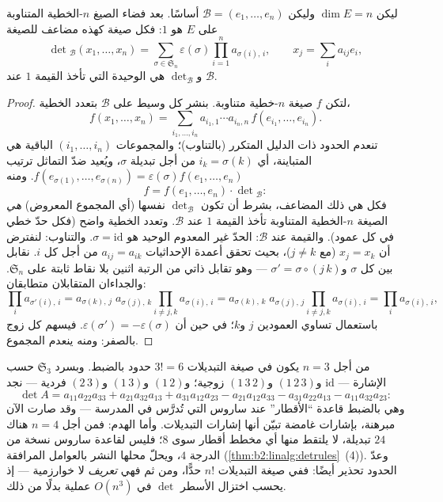 \begin{theorem}\label{thm:b2:linalg:detspace}
ليكن $\dim E = n$ وليكن $\mathcal{B} = (e_1, \dots, e_n)$ أساسًا. بعد
فضاء الصيغ $n$-الخطية المتناوبة على $E$ هو $1$:
فكل صيغة كهذه مضاعف للصيغة
\[
\det{}_{\mathcal{B}}(x_1, \dots, x_n)
= \sum_{\sigma \in \mathfrak{S}_n} \varepsilon(\sigma)
\prod_{i=1}^{n} a_{\sigma(i),\,i},
\qquad
x_j = \sum_{i} a_{ij} e_i ,
\]
و$\det_{\mathcal{B}}$ هي الوحيدة التي تأخذ القيمة $1$ عند
$\mathcal{B}$.
\end{theorem}

\begin{proof}
لتكن $f$ صيغة $n$-خطية متناوبة. بنشر كل وسيط على
$\mathcal{B}$ بتعدد الخطية،
\[
f(x_1, \dots, x_n)
= \sum_{i_1, \dots, i_n} a_{i_1,1}\cdots a_{i_n,n}\,
f(e_{i_1}, \dots, e_{i_n}).
\]
تنعدم الحدود ذات الدليل المتكرر (بالتناوب)؛ والمجموعات
$(i_1, \dots, i_n)$ الباقية هي المتباينة، أي $i_k =
\sigma(k)$ من أجل تبديلة $\sigma$، ويُعيد ضدّ التماثل ترتيب
$f(e_{\sigma(1)}, \dots, e_{\sigma(n)}) = \varepsilon(\sigma)
f(e_1, \dots, e_n)$. ومنه
\[
f = f(e_1, \dots, e_n) \cdot \det{}_{\mathcal{B}} :
\]
فكل  هي ذلك المضاعف، بشرط أن تكون
$\det_{\mathcal{B}}$ نفسها (أي المجموع المعروض) \emph{هي} الصيغة
$n$-الخطية المتناوبة تأخذ القيمة $1$ عند $\mathcal B$.
وتعدد الخطية واضح (فكل حدّ خطي في كل عمود).
والقيمة عند $\mathcal B$: الحدّ غير المعدوم الوحيد هو $\sigma =
\mathrm{id}$. والتناوب: لنفترض أن $x_j = x_k$ (مع $j \neq k$)، بحيث
تحقق أعمدة الإحداثيات $a_{i j} = a_{i k}$ من أجل كل
$i$. نقابل بين كل $\sigma$ و$\sigma' = \sigma\circ(j\,k)$ ---
وهو تقابل ذاتي من الرتبة اثنين بلا نقاط ثابتة على $\mathfrak{S}_n$.
والجداءان المتقابلان متطابقان:
\[
\prod_i a_{\sigma'(i),\,i}
= a_{\sigma(k),\,j}\; a_{\sigma(j),\,k}
\prod_{i \neq j,k} a_{\sigma(i),\,i}
= a_{\sigma(k),\,k}\; a_{\sigma(j),\,j}
\prod_{i \neq j,k} a_{\sigma(i),\,i}
= \prod_i a_{\sigma(i),\,i},
\]
باستعمال تساوي العمودين $j$ و$k$؛ في حين أن
$\varepsilon(\sigma') = -\varepsilon(\sigma)$. فيسهم كل زوج
بالصفر: ومنه ينعدم المجموع.
\end{proof}

\begin{example}\label{ex:b2:linalg:sarrus}
من أجل $n = 3$ يكون في صيغة التبديلات $3! = 6$ حدود بالضبط.
وبسرد $\mathfrak{S}_3$ حسب الإشارة ---
$\mathrm{id}$ و$(1\,2\,3)$ و$(1\,3\,2)$ زوجية؛
و$(1\,2)$ و$(1\,3)$ و$(2\,3)$ فردية --- نجد
\[
\det A = a_{11}a_{22}a_{33} + a_{21}a_{32}a_{13} +
a_{31}a_{12}a_{23}
- a_{21}a_{12}a_{33} - a_{31}a_{22}a_{13} -
a_{11}a_{32}a_{23} :
\]
وهي بالضبط قاعدة ``الأقطار'' عند ساروس التي تُدرَّس في المدرسة ---
وقد صارت الآن مبرهنة، بإشارات غامضة تبيّن أنها إشارات التبديلات.
وأما الهدم: فمن أجل $n = 4$ هناك $24$
تبديلة، لا يلتقط منها أي مخطط أقطار سوى $8$؛ فليس لقاعدة
ساروس نسخة من الدرجة $4$، ويحلّ محلها النشر بالعوامل
المرافقة (\cref{thm:b2:linalg:detrules}~(4)).
وعدّ الحدود تحذير أيضًا: ففي صيغة التبديلات
$n!$ حدًّا، ومن ثم فهي \emph{تعريف} لا خوارزمية --- إذ
يحسب اختزال الأسطر  $\det$ في $O(n^3)$
عملية بدلًا من ذلك.
\end{example}

